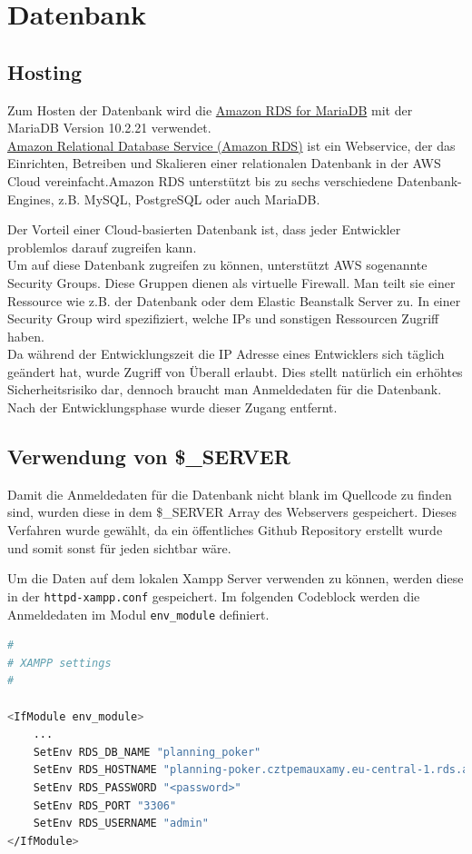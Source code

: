 \chapter{Datenbank}

\section{Hosting}
Zum Hosten der Datenbank wird die \href{https://aws.amazon.com/de/rds/mariadb/}{Amazon RDS for MariaDB} mit der MariaDB Version 10.2.21 verwendet. \\
\glqq\href{https://aws.amazon.com/de/rds/}{Amazon Relational Database Service (Amazon RDS)} ist ein Webservice, der das Einrichten, Betreiben und Skalieren einer relationalen Datenbank in der AWS Cloud vereinfacht.\grqq  Amazon RDS unterstützt bis zu sechs verschiedene Datenbank-Engines, z.B. MySQL, PostgreSQL oder auch MariaDB. \cite{AWSRDS}

Der Vorteil einer Cloud-basierten Datenbank ist, dass jeder Entwickler problemlos darauf zugreifen kann.\\
Um auf diese Datenbank zugreifen zu können, unterstützt AWS sogenannte Security Groups. Diese Gruppen dienen als virtuelle Firewall. Man teilt sie einer Ressource wie z.B. der Datenbank oder dem Elastic Beanstalk Server zu. In einer Security Group wird spezifiziert, welche IPs und sonstigen Ressourcen Zugriff haben.\\
Da während der Entwicklungszeit die IP Adresse eines Entwicklers sich täglich geändert hat, wurde Zugriff von Überall erlaubt. Dies stellt natürlich ein erhöhtes Sicherheitsrisiko dar, dennoch braucht man Anmeldedaten für die Datenbank. Nach der Entwicklungsphase wurde dieser Zugang entfernt.

\section{Verwendung von \$\_SERVER}
Damit die Anmeldedaten für die Datenbank nicht blank im Quellcode zu finden sind, wurden diese in dem \$\_SERVER Array des Webservers gespeichert. Dieses Verfahren wurde gewählt, da ein öffentliches Github Repository erstellt wurde und somit sonst für jeden sichtbar wäre.

Um die Daten auf dem lokalen Xampp Server verwenden zu können, werden diese in der \lstinline{httpd-xampp.conf} gespeichert. Im folgenden Codeblock werden die Anmeldedaten im Modul \lstinline{env_module} definiert.
\newpage
\begin{lstlisting}[caption={httpd-xampp.conf Umgebungsvariablen}, language=bash]
#
# XAMPP settings
#

<IfModule env_module>
    ...
    SetEnv RDS_DB_NAME "planning_poker"
    SetEnv RDS_HOSTNAME "planning-poker.cztpemauxamy.eu-central-1.rds.amazonaws.com"
    SetEnv RDS_PASSWORD "<password>"
    SetEnv RDS_PORT "3306"
    SetEnv RDS_USERNAME "admin"
</IfModule>
\end{lstlisting}

